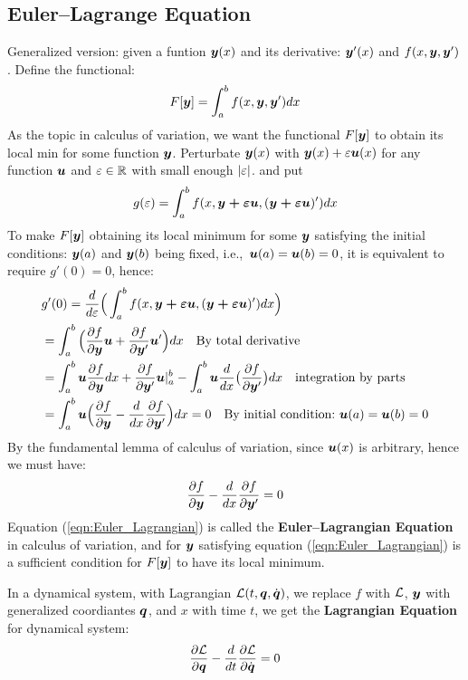 \documentclass[hidelinks]{article}[12pt]
\begin{document}
\subsection{Euler--Lagrange Equation}
Generalized version: given a funtion $\boldsymbol{y}(x)$ and its derivative: $\boldsymbol{y}'(x)$ and $f(x, \boldsymbol{y}, \boldsymbol{y}')$. Define the functional:
\begin{equation}
F[\boldsymbol{y}] = \int_a^b f(x, \boldsymbol{y}, \boldsymbol{y}') dx \label{eqn:functional}
\end{equation}
As the topic in calculus of variation, we want the functional $F[\boldsymbol{y}]$ to obtain its local min for some function $\boldsymbol{y}$. Perturbate $\boldsymbol{y}(x)$ with $\boldsymbol{y}(x) + \varepsilon \boldsymbol{u}(x)$ for any function $\boldsymbol{u}$ and $\varepsilon \in \mathbb R$ with small enough $\left|\varepsilon\right|$. and put \[g(\varepsilon) = \int_a^b f(x, \boldsymbol{y + \varepsilon u}, (\boldsymbol{y + \varepsilon u})') dx\]
To make $F[\boldsymbol{y}]$ obtaining its local minimum for some $\boldsymbol{y}$ satisfying the initial conditions: $\boldsymbol{y}(a)$ and $\boldsymbol{y}(b)$ being fixed, i.e.,\ $\boldsymbol{u}(a) = \boldsymbol{u}(b) = 0$, it is equivalent to require $g'(0) = 0$, hence:
\begin{align*}
& g'(0) = \frac{d}{d\varepsilon}\Big(\int_a^b f(x, \boldsymbol{y + \varepsilon u}, (\boldsymbol{y + \varepsilon u})') dx\Big)\\
& = \int_a^b \Big(\frac{\partial{f}}{\partial{\boldsymbol{y}}}\boldsymbol{u} + \frac{\partial{f}}{\partial{\boldsymbol{y}'}}\boldsymbol{u}' \Big)dx \quad \text{By total derivative}\\
& = \int_a^b \boldsymbol{u} \frac{\partial{f}}{\partial{\boldsymbol{y}}}  dx + \frac{\partial{f}}{\partial{\boldsymbol{y}'}}\boldsymbol{u} \vert_a^b - \int_a^b \boldsymbol{u} \frac{d}{dx}\big(\frac{\partial{f}}{\partial{\boldsymbol{y}'}}\big) dx \quad \text{integration by parts}\\
& = \int_a^b \boldsymbol{u} \Big(\frac{\partial{f}}{\partial{\boldsymbol{y}}} - \frac{d}{dx}\frac{\partial{f}}{\partial{\boldsymbol{y}'}}\Big) dx = 0 \quad \text{By initial condition:} ~ \boldsymbol{u}(a) = \boldsymbol{u}(b) = 0
\end{align*}
By the fundamental lemma of calculus of variation, since $\boldsymbol{u}(x)$ is arbitrary, hence we must have:
\begin{equation}
\frac{\partial{f}}{\partial{\boldsymbol{y}}} - \frac{d}{dx}\frac{\partial{f}}{\partial{\boldsymbol{y}'}} = 0 \label{eqn:Euler_Lagrangian}
\end{equation}
Equation (\ref{eqn:Euler_Lagrangian}) is called the \textbf{Euler--Lagrangian Equation} in calculus of variation, and for $\boldsymbol{y}$ satisfying equation (\ref{eqn:Euler_Lagrangian}) is a sufficient condition for $F[\boldsymbol{y}]$ to have its local minimum.

In a dynamical system, with Lagrangian ${\cal L}(t, \boldsymbol{q}, \dot{\boldsymbol{q}})$, we replace $f$ with ${\cal L}$, $\boldsymbol{y}$ with generalized coordiantes $\boldsymbol{q}$, and $x$ with time $t$, we get the \textbf{Lagrangian Equation} for dynamical system:
\begin{equation}
\frac{\partial{{\cal L}}}{\partial{\boldsymbol{q}}} - \frac{d}{dt}\frac{\partial{{\cal L}}}{\partial{\dot{\boldsymbol{q}}}} = 0 \label{eqn:Lagrangian} 
\end{equation}
\end{document}
